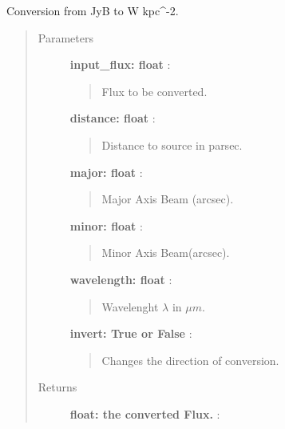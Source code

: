 \documentclass[a4paper,10pt,english]{sphinxmanual}
\begin{document}
\begin{fulllineitems}
\label{functions:astrolyze.functions.units.JyBToWKpc2}
Conversion from JyB to W kpc\textasciicircum{}-2.
\begin{quote}\begin{description}
\item[{Parameters }] \leavevmode
\textbf{input\_flux:  float} :
\begin{quote}

Flux to be converted.
\end{quote}

\textbf{distance: float} :
\begin{quote}

Distance to source in parsec.
\end{quote}

\textbf{major: float} :
\begin{quote}

Major Axis Beam (arcsec).
\end{quote}

\textbf{minor: float} :
\begin{quote}

Minor Axis Beam(arcsec).
\end{quote}

\textbf{wavelength: float} :
\begin{quote}

Wavelenght $\lambda$ in $\mu m$.
\end{quote}

\textbf{invert: True or False} :
\begin{quote}

Changes the direction of conversion.
\end{quote}

\item[{Returns }] \leavevmode
\textbf{float: the converted Flux.} :

\end{description}\end{quote}

\end{fulllineitems}

\end{document}
